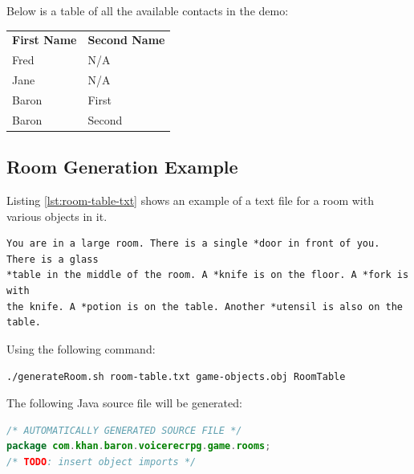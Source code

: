 \documentclass[11pt]{article}
\begin{document}
\begin{appendices}
Below is a table of all the available contacts in the demo:

\begin{table}[H]
\centering
\begin{tabular}{ll}
\textbf{First Name} & \textbf{Second Name} \\
Fred                & N/A                  \\
Jane                & N/A                  \\
Baron               & First                \\
Baron               & Second              
\end{tabular}
\end{table}

\newpage
\subsection{Room Generation Example}
\label{appendix:room-gen-ex}

Listing \ref{lst:room-table-txt} shows an example of a text file for a room with various objects in it.

\begin{lstlisting}[caption=room-table.txt, label=lst:room-table-txt]
You are in a large room. There is a single *door in front of you. There is a glass
*table in the middle of the room. A *knife is on the floor. A *fork is with
the knife. A *potion is on the table. Another *utensil is also on the table.
\end{lstlisting}

Using the following command:

\begin{center}
\texttt{./generateRoom.sh room-table.txt game-objects.obj RoomTable}
\end{center}

The following Java source file will be generated:

\begin{lstlisting}[language=Java, label=lst:room-table-java]
/* AUTOMATICALLY GENERATED SOURCE FILE */
package com.khan.baron.voicerecrpg.game.rooms;
/* TODO: insert object imports */


\end{lstlisting}
\end{appendices}
\end{document}
